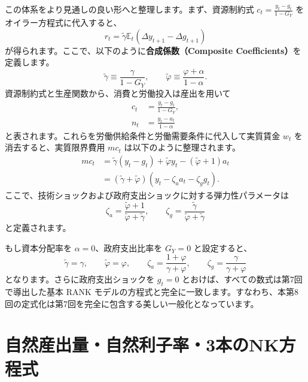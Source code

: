 \documentclass[
  japanese,
  lualatex,
  ja=standard,
  12pt,
  a4paper]{ltjsarticle}
\begin{document}
この体系をより見通しの良い形へと整理します。まず、資源制約式
\(c_t = \frac{y_t - g_t}{1-G_Y}\) をオイラー方程式に代入すると、 \[
r_t
=
\tilde{\gamma}\mathbb{E}_t(\Delta y_{t+1}-\Delta g_{t+1})
\] が得られます。ここで、以下のように\textbf{合成係数（Composite
Coefficients）}を定義します。 \[
\tilde{\gamma}\equiv\frac{\gamma}{1-G_Y},
\qquad
\tilde{\varphi}\equiv\frac{\varphi+\alpha}{1-\alpha}.
\] 資源制約式と生産関数から、消費と労働投入は産出を用いて \[
\begin{aligned}
c_t&=\frac{y_t-g_t}{1-G_Y},\\
n_t&=\frac{y_t-a_t}{1-\alpha}
\end{aligned}
\] と表されます。これらを労働供給条件と労働需要条件に代入して実質賃金
\(w_t\) を消去すると、実質限界費用 \(mc_t\) は以下のように整理されます。
\[
\begin{aligned}
mc_t
&=
\tilde{\gamma}(y_t-g_t)
+\tilde{\varphi}y_t
-(\tilde{\varphi}+1)a_t\\
&=
(\tilde{\gamma}+\tilde{\varphi})
\left(y_t-\zeta_a a_t-\zeta_g g_t\right).
\end{aligned}
\] ここで、技術ショックおよび政府支出ショックに対する弾力性パラメータは
\[
\zeta_a=\frac{\tilde{\varphi}+1}{\tilde{\varphi}+\tilde{\gamma}},
\qquad
\zeta_g=\frac{\tilde{\gamma}}{\tilde{\varphi}+\tilde{\gamma}}
\] と定義されます。

\begin{tcolorbox}[enhanced jigsaw, arc=.35mm, bottomrule=.15mm, bottomtitle=1mm, breakable, colback=white, colbacktitle=quarto-callout-note-color!10!white, colframe=quarto-callout-note-color-frame, coltitle=black, left=2mm, leftrule=.75mm, opacityback=0, opacitybacktitle=0.6, rightrule=.15mm, title=\textcolor{quarto-callout-note-color}{\faInfo}\hspace{0.5em}{\textbf{補足：第7回の特殊ケースへの帰着}}, titlerule=0mm, toprule=.15mm, toptitle=1mm]

もし資本分配率を \(\alpha=0\)、政府支出比率を \(G_Y=0\) と設定すると、
\[
\tilde{\gamma}=\gamma,
\qquad
\tilde{\varphi}=\varphi,
\qquad
\zeta_a=\frac{1+\varphi}{\gamma+\varphi},
\qquad
\zeta_g=\frac{\gamma}{\gamma+\varphi}
\] となります。さらに政府支出ショックを \(g_t=0\)
とおけば、すべての数式は第7回で導出した基本 RANK
モデルの方程式と完全に一致します。すなわち、本第8回の定式化は第7回を完全に包含する美しい一般化となっています。

\end{tcolorbox}

\Needspace{0.72\textheight}

\section{自然産出量・自然利子率・3本のNK方程式}\label{ux81eaux7136ux7523ux51faux91cfux81eaux7136ux5229ux5b50ux73873ux672cux306enkux65b9ux7a0bux5f0f}
\end{document}
